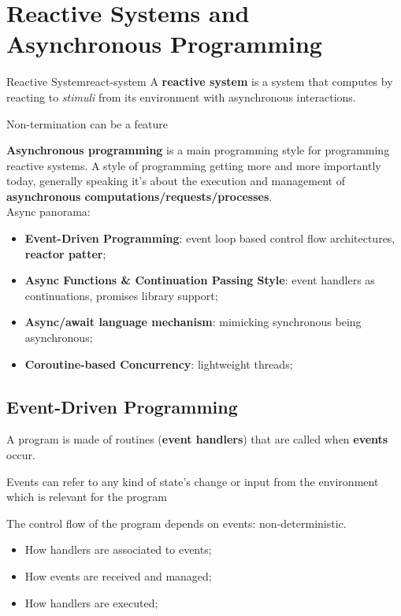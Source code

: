 \chapter{Reactive Systems and Asynchronous Programming}\label{chap:rs_reactive_systems_and_asynchronous_programming} %
\begin{definition}{Reactive System}{react-system}
    A \textbf{reactive system} is a system that computes by reacting to \textit{stimuli} from its environment with asynchronous interactions.
    \begin{note}
        Non-termination can be a feature
    \end{note}
\end{definition}
\textbf{Asynchronous programming} is a main programming style for programming reactive systems.
A style of programming getting more and more importantly today, generally speaking it's about the execution and management of \textbf{asynchronous computations/requests/processes}.
\\
Async panorama:
\begin{itemize}
    \item \textbf{Event-Driven Programming}: event loop based control flow architectures, \textbf{reactor patter};
    \item \textbf{Async Functions \& Continuation Passing Style}: event handlers as continuations, promises library support;
    \item \textbf{Async/await language mechanism}: mimicking synchronous being asynchronous;
    \item \textbf{Coroutine-based Concurrency}: lightweight threads;
\end{itemize}
%
\section{Event-Driven Programming}\label{sec:rs_event_driven_programming} %
A program is made of routines (\textbf{event handlers}) that are called when \textbf{events} occur.
\begin{note}
    Events can refer to any kind of state's change or input from the environment which is relevant for the program
\end{note}
The control flow of the program depends on events: non-deterministic.
\begin{note}[Aspects]
    \begin{itemize}
        \item How handlers are associated to events;
        \item How events are received and managed;
        \item How handlers are executed;
    \end{itemize}
\end{note}
%
